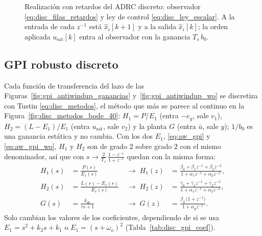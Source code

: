 \begin{figure}[H]
{%
  }
  \caption[Realización con retardos del ADRC discreto]{Realización con
    retardos del ADRC discreto: observador \eqref{eq:disc_filas_retardos} y ley
    de control \eqref{eq:disc_ley_escalar}. A la entrada de cada $z^{-1}$ está
    $\hat{x}_i[k+1]$ y a la salida $\hat{x}_i[k]$; la orden aplicada
    $u_{\mathrm{sat}}[k]$ entra al observador con la ganancia $T_s\,b_0$.}
  \label{fig:adrc_discreto_retardos}
\end{figure}

\subsection{GPI robusto discreto}
\label{subsec:disc_gpi}

Cada función de transferencia del lazo de las
Figuras~\ref{fig:gpi_antiwindup_ganancias} y~\ref{fig:gpi_antiwindup_wo} se discretiza con
Tustin \eqref{eq:disc_metodos}, el método que más se parece al continuo en la
Figura~\ref{fig:disc_metodos_bode_40}: $H_1 = P/E_1$ (entra $-e_y$, sale $v_1$),
$H_2 = (L - E_1)/E_1$ (entra $u_{\mathrm{sat}}$, sale $v_2$) y la planta $G$ (entra
$\bar{u}$, sale $y$); $1/b_0$ es una ganancia estática y no cambia. Con los dos $E_1$,
\eqref{eq:aw_gpi} y \eqref{eq:aw_gpi_wo}, $H_1$ y $H_2$ son de grado $2$ sobre grado $2$ con el
mismo denominador, así que con $s \to \frac{2}{T_s}\,\frac{1 - z^{-1}}{1 + z^{-1}}$ quedan con
la misma forma:
\begin{equation}
\begin{aligned}
H_1(s) &= \frac{P(s)}{E_1(s)} & \;\longrightarrow\; H_1(z) &= \frac{\beta_0 + \beta_1 z^{-1} + \beta_2 z^{-2}}{1 + \alpha_1 z^{-1} + \alpha_2 z^{-2}}, \\[6pt]
H_2(s) &= \frac{L(s) - E_1(s)}{E_1(s)} & \;\longrightarrow\; H_2(z) &= \frac{\bar{\gamma}_0 + \bar{\gamma}_1 z^{-1} + \bar{\gamma}_2 z^{-2}}{1 + \alpha_1 z^{-1} + \alpha_2 z^{-2}}, \\[6pt]
G(s) &= \frac{k_{dc}}{\tau s + 1} & \;\longrightarrow\; G(z) &= \frac{\beta_g\,\bigl(1 + z^{-1}\bigr)}{1 + \alpha_g z^{-1}} .
\end{aligned}
\label{eq:disc_gpi_tf}
\end{equation}
Solo cambian los valores de los coeficientes, dependiendo de si se usa $E_1 = s^2 + k_2 s + k_1$
o $E_1 = (s + \omega_o)^2$ (Tabla~\ref{tab:disc_gpi_coef}).


